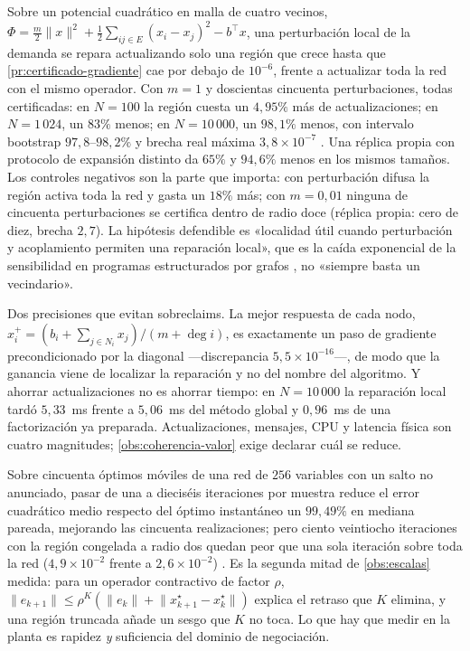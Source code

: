 \begin{observacion}
\label{obs:reparacion-local}
Sobre un potencial cuadrático en malla de cuatro vecinos,
$\Phi=\tfrac m2\lVert x\rVert^2+\tfrac12\sum_{ij\in E}(x_i-x_j)^2-b^{\!\top}x$,
una perturbación local de la demanda se repara actualizando solo una región que
crece hasta que \cref{pr:certificado-gradiente} cae por debajo de $10^{-6}$,
frente a actualizar toda la red con el mismo operador. Con $m=1$ y doscientas
cincuenta perturbaciones, todas certificadas: en $N=100$ la región cuesta un
$4{,}95\%$ más de actualizaciones; en $N=1\,024$, un $83\%$ menos; en
$N=10\,000$, un $98{,}1\%$ menos, con intervalo bootstrap $97{,}8$--$98{,}2\%$
y brecha real máxima $3{,}8\times10^{-7}$ \cite{mrob2026r11}. Una réplica
propia con protocolo de expansión distinto da $65\%$ y $94{,}6\%$ menos en los
mismos tamaños. Los controles negativos son la parte que importa: con
perturbación difusa la región activa toda la red y gasta un $18\%$ más; con
$m=0{,}01$ ninguna de cincuenta perturbaciones se certifica dentro de radio
doce (réplica propia: cero de diez, brecha $2{,}7$). La hipótesis defendible
es «localidad útil cuando perturbación y acoplamiento permiten una reparación
local», que es la caída exponencial de la sensibilidad en programas
estructurados por grafos \cite{shin2022exponential}, no «siempre basta un
vecindario».

Dos precisiones que evitan sobreclaims. La mejor respuesta de cada nodo,
$x_i^{+}=(b_i+\sum_{j\in N_i}x_j)/(m+\deg i)$, es exactamente un paso de
gradiente precondicionado por la diagonal —discrepancia $5{,}5\times10^{-16}$—,
de modo que la ganancia viene de localizar la reparación y no del nombre del
algoritmo. Y ahorrar actualizaciones no es ahorrar tiempo: en $N=10\,000$ la
reparación local tardó $5{,}33$~ms frente a $5{,}06$~ms del método global y
$0{,}96$~ms de una factorización ya preparada. Actualizaciones, mensajes, CPU y
latencia física son cuatro magnitudes; \cref{obs:coherencia-valor} exige
declarar cuál se reduce.
\end{observacion}

\begin{observacion}
\label{obs:mas-calculo}
Sobre cincuenta óptimos móviles de una red de $256$ variables con un salto no
anunciado, pasar de una a dieciséis iteraciones por muestra reduce el error
cuadrático medio respecto del óptimo instantáneo un $99{,}49\%$ en mediana
pareada, mejorando las cincuenta realizaciones; pero ciento veintiocho
iteraciones con la región congelada a radio dos quedan peor que una sola
iteración sobre toda la red ($4{,}9\times10^{-2}$ frente a
$2{,}6\times10^{-2}$) \cite{mrob2026r11}. Es la segunda mitad de
\cref{obs:escalas} medida: para un operador contractivo de factor $\rho$,
$\lVert e_{k+1}\rVert\le\rho^{K}(\lVert e_k\rVert+\lVert x^\star_{k+1}-x^\star_k\rVert)$
explica el retraso que $K$ elimina, y una región truncada añade un sesgo que
$K$ no toca. Lo que hay que medir en la planta es rapidez \emph{y} suficiencia
del dominio de negociación.
\end{observacion}

